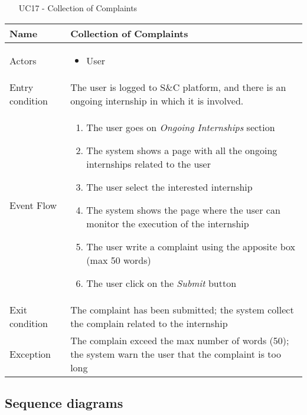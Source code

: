 				
				\begin{table} [H]
					\centering
					\begin{itemize}
						\item [UC17] - Collection of Complaints
					\end{itemize}
					
					\begin{tabular}{|| P{7.5cm} | P{7.5cm} ||}
						\hline
						Name & Collection of Complaints \\
						\hline
						Actors & \parbox{5cm}{\begin{itemize}
								\item User
							\end{itemize}
						} \\
						\hline
						Entry condition & The user is logged to S\&C platform, 
						and there is an ongoing internship in 
						which it is involved.  \\
						\hline
						Event Flow & \parbox{5cm}{\begin{enumerate}[label=\alpha]
								\item The user goes on \textit{Ongoing 
								Internships} section 
								\item The system shows a page with 
								all the ongoing internships 
								related to the user  
								\item The user select the interested 
								internship  
								\item The system shows the page 
								where the user can monitor the 
								execution of the internship
								\item The user write a complaint 
								using the apposite box (max 50 
								words) 
								\item The user click on the \textit{Submit}
								button
						\end{enumerate}} \\
						\hline 
						Exit condition & The complaint has been submitted; 
						the system collect the complain 
						related to the internship \\
						\hline
						Exception & The complain exceed the max number 
						of words (50); the system warn the 
						user that the complaint is too long \\
						\hline
					\end{tabular}
				\end{table}
				
		\subsection{Sequence diagrams}
		

